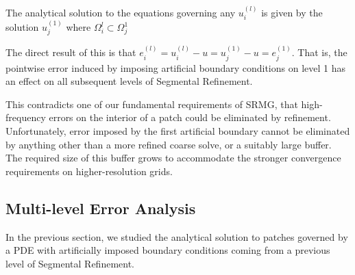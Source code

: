 \documentclass[final]{siamart1116}
\numberwithin{theorem}{section}
\begin{document}


\begin{corollary}
The analytical solution to the equations governing any $u^{(l)}_i$ is given by the solution $u^{(1)}_j$ where $\Omega^{l}_i \subset \Omega^{1}_j$
\end{corollary}

The direct result of this is that $e^{(l)}_i = u^{(l)}_i - u = u^{(1)}_j - u = e^{(1)}_j$. That is, the pointwise error induced by imposing artificial boundary conditions on level 1 has an effect on all subsequent levels of Segmental Refinement. 

This contradicts one of our fundamental requirements of SRMG, that high-frequency errors on the interior of a patch could be eliminated by refinement. Unfortunately, error imposed by the first artificial boundary cannot be eliminated by anything other than a more refined coarse solve, or a suitably large buffer. The required size of this buffer grows to accommodate the stronger convergence requirements on higher-resolution grids. 






\subsection{Multi-level Error Analysis}
In the previous section, we studied the analytical solution to patches governed by a PDE with artificially imposed boundary conditions coming from a previous level of Segmental Refinement. 
\end{document}
